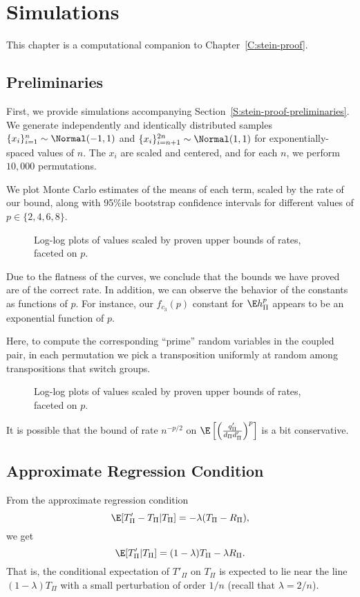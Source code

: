 \chapter{Simulations}
\label{C:simulations}
This chapter is a computational companion to Chapter~\ref{C:stein-proof}.

\section{Preliminaries}
First, we provide simulations accompanying
Section~\ref{S:stein-proof-preliminaries}.  We generate independently
and identically distributed samples $\{x_i\}_{i=1}^{n} \sim
\Normal(-1, 1)$ and $\{x_i\}_{i=n+1}^{2n} \sim \Normal(1, 1)$ for
exponentially-spaced values of $n$.  The $x_i$ are scaled and
centered, and for each $n$, we perform $10,000$ permutations.

We plot Monte Carlo estimates of the means of each term, scaled by the
rate of our bound, along with 95\%ile bootstrap confidence intervals
for different values of $p \in \{2, 4, 6, 8\}$.

\begin{figure}[!ht]
  \centering
  
  \caption{Log-log plots of values scaled by proven upper bounds of rates, faceted on $p$.}
\end{figure}
Due to the flatness of the curves, we conclude that the bounds we have
proved are of the correct rate.  In addition, we can observe the
behavior of the constants as functions of $p$.  For instance, our
$f_{c_3}(p)$ constant for $\E h_{\Pi}^p$ appears to be an exponential
function of $p$.
\clearpage

Here, to compute the corresponding ``prime'' random variables in the
coupled pair, in each permutation we pick a transposition uniformly at
random among transpositions that switch groups.

\begin{figure}[!ht]
  \centering
  
  \caption{Log-log plots of values scaled by proven upper bounds of rates, faceted on $p$.}
\end{figure}
It is possible that the bound of rate $n^{-p/2}$ on
$\E \left [ \left ( \frac{q_{\Pi}'}{d_{\Pi}d_{\Pi}'} \right )^p \right ]$ is a bit conservative.
\clearpage

\section{Approximate Regression Condition}
From the approximate regression condition
\begin{equation*}
  \E [T'_{\Pi} - T_{\Pi} | T_{\Pi}] = -\lambda (T_{\Pi} - R_{\Pi}),
\end{equation*}
we get
\begin{equation*}
  \E [T'_{\Pi}| T_{\Pi}] = (1-\lambda) T_{\Pi} - \lambda R_{\Pi}.
\end{equation*}
That is, the conditional expectation of $T'_{\Pi}$ on $T_{\Pi}$ is expected to lie near the line
$(1-\lambda) T_{\Pi}$ with a small perturbation of order $1 / n$ (recall that $\lambda = 2 / n$).

